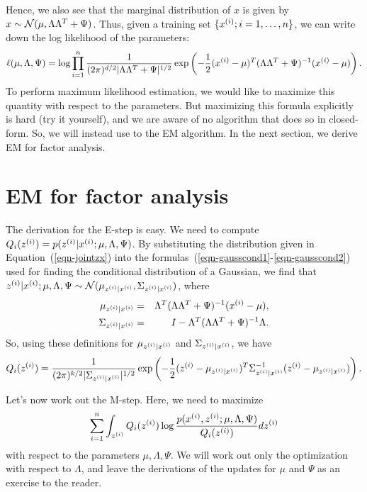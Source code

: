 \documentclass{article}
\begin{document}
Hence, we also see that the marginal distribution of $x$ is given
by $x \sim {\cal N}(\mu, \Lambda\Lambda^T+\Psi)$.  Thus, given a training set $\{{x^{(i)}}; i=1,\ldots,{n}\}$,
we can write down the log likelihood of the parameters:
\[
\ell(\mu, \Lambda, \Psi) = \log \prod_{i=1}^{n} \frac{1}{(2\pi)^{{d}/2}|\Lambda\Lambda^T+\Psi|^{1/2}}
\exp\left(-\frac{1}{2} ({x^{(i)}} - \mu)^T (\Lambda\Lambda^T+\Psi)^{-1} ({x^{(i)}}-\mu) \right).
\]
To perform maximum likelihood estimation, we would like to maximize this quantity with
respect to the parameters.  But maximizing this formula explicitly is hard (try it yourself),
and we are aware of no algorithm that does so in closed-form.
So, we will instead use to the EM algorithm.  In the next section, we derive EM for
factor analysis.

\section{EM for factor analysis}

The derivation for the E-step is easy.  We need to
compute $Q_i({z^{(i)}}) = p({z^{(i)}} | {x^{(i)}}; \mu, \Lambda, \Psi)$.  By substituting the
distribution given in Equation~(\ref{eqn-jointzx}) into
the formulas~(\ref{eqn-gausscond1}-\ref{eqn-gausscond2}) used for finding the conditional
distribution of a Gaussian, we
find that ${z^{(i)}} | {x^{(i)}}; \mu, \Lambda, \Psi \sim {\cal N}(\mu_{{z^{(i)}}|{x^{(i)}}}, \Sigma_{{z^{(i)}}|{x^{(i)}}})$,
where
\begin{eqnarray*}
\mu_{{z^{(i)}}|{x^{(i)}}} &=& \Lambda^T(\Lambda\Lambda^T+\Psi)^{-1}({x^{(i)}}-\mu), \\
\Sigma_{{z^{(i)}}|{x^{(i)}}} &=& I - \Lambda^T(\Lambda\Lambda^T+\Psi)^{-1}\Lambda.
\end{eqnarray*}
So, using these definitions for $\mu_{{z^{(i)}}|{x^{(i)}}}$ and $\Sigma_{{z^{(i)}}|{x^{(i)}}}$, we have
\[
Q_i({z^{(i)}}) = \frac{1}{(2\pi)^{k/2}|\Sigma_{{z^{(i)}}|{x^{(i)}}}|^{1/2}} \exp\left(-\frac{1}{2}({z^{(i)}}-\mu_{{z^{(i)}}|{x^{(i)}}})^T\Sigma_{{z^{(i)}}|{x^{(i)}}}^{-1}({z^{(i)}}-\mu_{{z^{(i)}}|{x^{(i)}}})\right).
\]

Let's now work out the M-step.  Here, we need to maximize
\begin{equation}
\sum_{i=1}^{n} \int_{z^{(i)}} Q_i({z^{(i)}}) \log \frac{p({x^{(i)}}, {z^{(i)}} ; \mu, \Lambda, \Psi)}{Q_i({z^{(i)}})} d{z^{(i)}}
\label{eqn-emfa1}
\end{equation}
with respect to the parameters $\mu, \Lambda, \Psi$.  We will work out only the
optimization with respect to $\Lambda$, and leave the derivations
of the updates for $\mu$ and $\Psi$ as an exercise to the reader.
\end{document}

